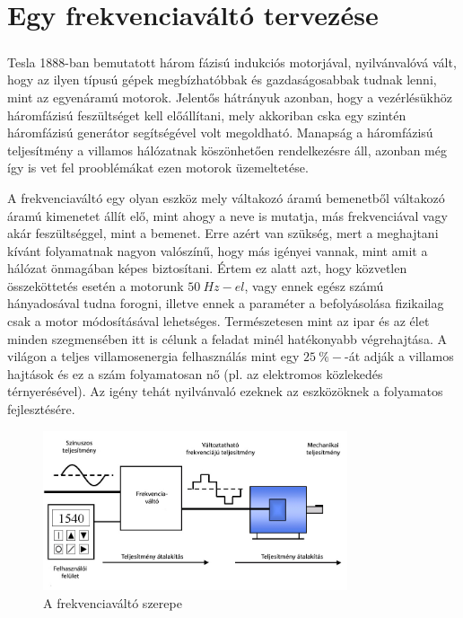 \chapter{Egy frekvenciaváltó tervezése}

\paragraph{}

Tesla 1888-ban bemutatott három fázisú indukciós motorjával, nyilvánvalóvá vált, hogy az ilyen típusú gépek megbízhatóbbak és gazdaságosabbak tudnak lenni, mint az egyenáramú motorok. Jelentős hátrányuk azonban, hogy a vezérlésükhöz háromfázisú feszültséget kell előállítani, mely akkoriban cska egy szintén háromfázisú generátor segítségével volt megoldható. Manapság a háromfázisú teljesítmény a villamos hálózatnak köszönhetően rendelkezésre áll, azonban még így is vet fel prooblémákat ezen motorok üzemeltetése.

A frekvenciaváltó egy olyan eszköz mely váltakozó áramú bemenetből váltakozó áramú kimenetet állít elő, mint ahogy a neve is mutatja, más frekvenciával vagy akár feszültséggel, mint a bemenet. Erre azért van szükség, mert a meghajtani kívánt folyamatnak nagyon valószínű, hogy más igényei vannak, mint amit a hálózat önmagában képes biztosítani. Értem ez alatt azt, hogy közvetlen összeköttetés esetén a motorunk $50\ Hz-el$, vagy ennek egész számú hányadosával tudna forogni, illetve ennek a paraméter a befolyásolása fizikailag csak a motor módosításával lehetséges. Természetesen mint az ipar és az élet minden szegmensében itt is célunk a feladat minél hatékonyabb végrehajtása. A világon a teljes villamosenergia felhasználás mint egy $25\ \%-$-át adják a villamos hajtások és ez a szám folyamatosan nő (pl. az elektromos közlekedés térnyerésével). Az igény tehát nyilvánvaló ezeknek az eszközöknek a folyamatos fejlesztésére.

\begin{figure}[!h]
	\centering
	\includegraphics[width = 0.8\textwidth]{figures/VFD_System.jpg}
	\caption{A frekvenciaváltó szerepe} 
	\label{fig:vfd_system}
\end{figure}

